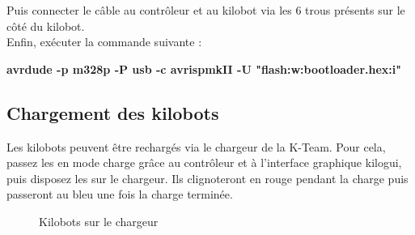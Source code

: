 \documentclass[a4paper,8pt]{report}
\begin{document}
Puis connecter le c\^able au contr\^oleur et au kilobot via les 6 trous pr\'esents sur le c\^ot\'e du kilobot.\\
Enfin, ex\'ecuter la commande suivante :\\

\begin{center}
  \textbf{avrdude -p m328p -P usb -c avrispmkII -U "flash:w:bootloader.hex:i"}
\end{center}

\smallskip
\begin{center}
\end{center}

\newpage
\subsection*{Chargement des kilobots}\label{sec:name}

Les kilobots peuvent être recharg\'es via le chargeur de la K-Team. Pour cela, passez les en mode charge grâce au contrôleur et à l'interface graphique kilogui, puis disposez les sur le chargeur. Ils clignoteront en rouge pendant la charge puis passeront au bleu une fois la charge termin\'ee.

\begin{figure}[!h]
    \centering
    \caption{Kilobots sur le chargeur}
\end{figure}
\end{document}
